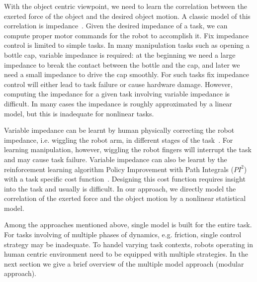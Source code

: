 With the object centric viewpoint, we need to learn the correlation between the exerted force of the object and the desired object motion. A classic model of this correlation is impedance~\citep{howard2010transferring,wimbock2012comparison}. Given the desired impedance of a task, we can compute proper motor commands for the robot to accomplish it. Fix impedance control is limited to simple tasks. In many manipulation tasks such as opening a bottle cap, variable impedance is required: at the beginning we need a large impedance to break the contact between the bottle and the cap, and later we need a small impedance to drive the cap smoothly. For such tasks fix impedance control will either lead to task failure or cause hardware damage.
However, computing the impedance for a given task involving variable impedance is difficult.
In many cases the impedance is roughly approximated by a linear model, but this is inadequate for nonlinear tasks.


Variable impedance can be learnt by human physically correcting the robot impedance, i.e. wiggling the robot arm, in different stages of the task~\citep{kronander2012online}. For learning manipulation, however, wiggling the robot fingers will interrupt the task and may cause task failure.
Variable impedance can also be learnt by the reinforcement learning algorithm Policy Improvement with Path Integrals ($PI^2$) with a task specific cost function~\citep{buchli2011learning}. Designing this cost function requires insight into the task and usually is difficult. In our approach, we directly model the correlation of the exerted force and the object motion by a nonlinear statistical model.



Among the approaches mentioned above, single model is built for the entire task. For tasks involving of multiple phases of dynamics, e.g. friction, single control strategy may be inadequate. To handel varying task contexts, robots operating in human centric environment need to be equipped with multiple strategies. In the next section we give a brief overview of the multiple model approach (modular approach).


